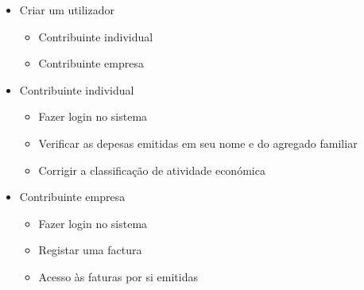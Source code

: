 \documentclass[a4paper]{article}
\begin{document}
\begin{itemize}
	\item{Criar um utilizador}
		\begin{itemize}
			\item{Contribuinte individual}
			\item{Contribuinte empresa}
		\end{itemize}
	\item{Contribuinte individual}
		\begin{itemize}
			\item{Fazer login no sistema}
			\item{Verificar as depesas emitidas em seu nome e do agregado familiar}
			\item{Corrigir a classificação de atividade económica}
		\end{itemize}
	\item{Contribuinte empresa}
		\begin{itemize}
			\item{Fazer login no sistema}
			\item{Registar uma factura}
			\item{Acesso às faturas por si emitidas}
		\end{itemize}

\end{itemize}
\end{document}
